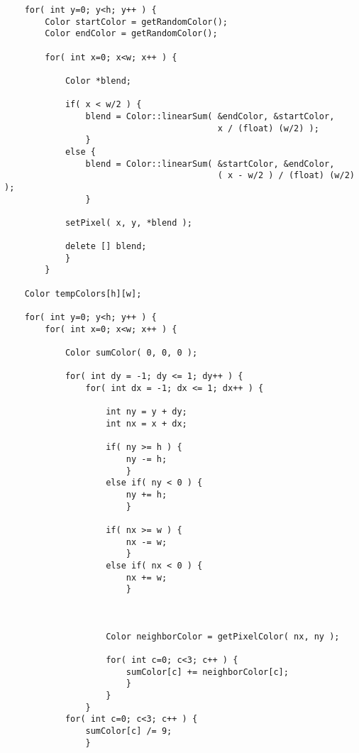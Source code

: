 \documentclass[12pt]{article}
\def\Tiny{\fontsize{8.5pt}{8.5pt}\selectfont}
\begin{document}
{\Tiny
\vspace*{\fill}
\begin{center}
\begin{minipage}{10cm}
\begin{verbatim}
    for( int y=0; y<h; y++ ) {
        Color startColor = getRandomColor();
        Color endColor = getRandomColor();
        
        for( int x=0; x<w; x++ ) {
            
            Color *blend;

            if( x < w/2 ) {
                blend = Color::linearSum( &endColor, &startColor,
                                          x / (float) (w/2) );
                }
            else {
                blend = Color::linearSum( &startColor, &endColor,
                                          ( x - w/2 ) / (float) (w/2) );
                }

            setPixel( x, y, *blend );
            
            delete [] blend;
            }
        }

    Color tempColors[h][w];

    for( int y=0; y<h; y++ ) {
        for( int x=0; x<w; x++ ) {
                
            Color sumColor( 0, 0, 0 );
            
            for( int dy = -1; dy <= 1; dy++ ) {
                for( int dx = -1; dx <= 1; dx++ ) {
                        
                    int ny = y + dy;
                    int nx = x + dx;
                    
                    if( ny >= h ) {
                        ny -= h;
                        }
                    else if( ny < 0 ) {
                        ny += h;
                        }
                    
                    if( nx >= w ) {
                        nx -= w;
                        }
                    else if( nx < 0 ) {
                        nx += w;
                        }
                        
                    
                    
                    Color neighborColor = getPixelColor( nx, ny );

                    for( int c=0; c<3; c++ ) {
                        sumColor[c] += neighborColor[c];
                        }
                    }
                }
            for( int c=0; c<3; c++ ) {
                sumColor[c] /= 9;
                }
            

\end{verbatim}
\end{minipage}
\end{center}}
\end{document}
